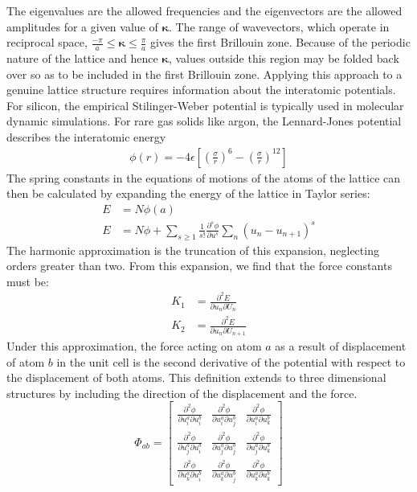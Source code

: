 %
The eigenvalues are the allowed frequencies and the eigenvectors are the allowed amplitudes for a given value of $\pmb{\kappa}$. The range of wavevectors, which operate in reciprocal space,  $\frac{-\pi}{a}\leq \pmb{\kappa}\leq\frac{\pi}{a}$ gives the first Brillouin zone. Because of the periodic nature of the lattice and hence $\pmb{\kappa}$, values outside this region may be folded back over so as to be included in the first Brillouin zone.
Applying this approach to a genuine lattice structure requires information about the interatomic potentials. For silicon, the empirical Stilinger-Weber potential is typically used in molecular dynamic simulations. For rare gas solids like argon, the Lennard-Jones potential describes the interatomic energy
\begin{align}
	\phi(r)=-4\epsilon[(\frac{\sigma}{r})^6-(\frac{\sigma}{r})^{12}]	
\end{align}
The spring constants in the equations of motions of the atoms of the lattice can then be calculated by expanding the energy of the lattice in Taylor series:
%
\begin{align}
	E&=N\phi(a)\\
	E&=N\phi+\sum_{s\geq1}\frac{1}{s!}\frac{\partial^s\phi}{\partial u^s}\sum_n(u_n-u_{n+1})^s
\end{align}
%
The harmonic approximation is the truncation of this expansion, neglecting orders greater than two. From this expansion, we find that the force constants must be:
%
\begin{align}
	K_1&=\frac{\partial^2 E}{\partial u_n\partial U_{n}}\\
	K_2&=\frac{\partial^2 E}{\partial u_n\partial U_{n+1}}
\end{align}
%
Under this approximation, the force acting on atom $a$ as a result of displacement of atom $b$ in the unit cell is the second derivative of the potential with respect to the displacement of both atoms. This definition extends to three dimensional structures by including the direction of the displacement and the force.
%
\begin{equation}
\Phi_{ab}=
\begin{bmatrix}
  \frac{\partial^2 \phi}{\partial u^a_i\partial u^b_i} & \frac{\partial^2 \phi}{\partial u^a_i\partial u^b_j} &\frac{\partial^2 \phi}{\partial u^a_i\partial u^b_k}\\
  \frac{\partial^2 \phi}{\partial u^a_j\partial u^b_i} & \frac{\partial^2 \phi}{\partial u^a_j\partial u^b_j} &\frac{\partial^2 \phi}{\partial u^a_j\partial u^b_k}\\
\frac{\partial^2 \phi}{\partial u^a_k\partial u^b_i} & \frac{\partial^2 \phi}{\partial u^a_k\partial u^b_j} &\frac{\partial^2 \phi}{\partial u^a_k\partial u^b_k}
 \end{bmatrix}
\end{equation}
